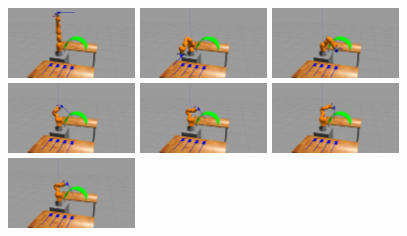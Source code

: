 \begin{center}
\begin{figure}[H]
\centering
\includegraphics[width=0.3\textwidth]{images/robot_planner1/robot_planner1_1}
\includegraphics[width=0.3\textwidth]{images/robot_planner1/robot_planner1_2}
\includegraphics[width=0.3\textwidth]{images/robot_planner1/robot_planner1_3}\\
\includegraphics[width=0.3\textwidth]{images/robot_planner1/robot_planner1_4}
\includegraphics[width=0.3\textwidth]{images/robot_planner1/robot_planner1_5}
\includegraphics[width=0.3\textwidth]{images/robot_planner1/robot_planner1_6}\\
\includegraphics[width=0.3\textwidth]{images/robot_planner1/robot_planner1_7}

\end{figure}
\end{center}
